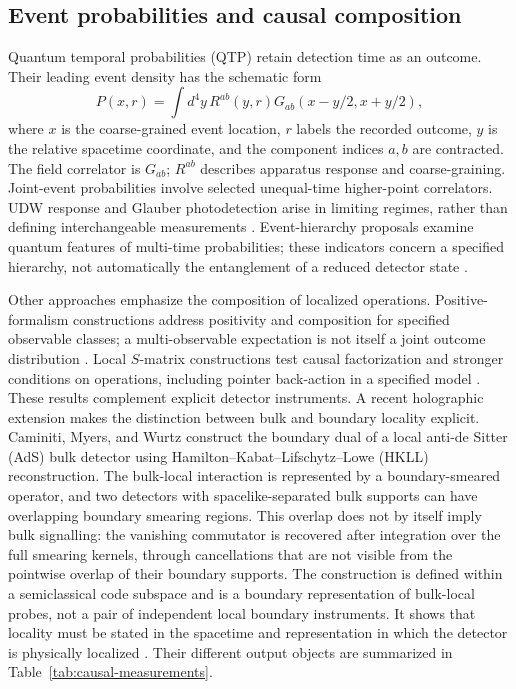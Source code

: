 \documentclass[pdflatex,sn-mathphys-num]{sn-jnl}
\begin{document}
\subsection{Event probabilities and causal composition}
Quantum temporal probabilities (QTP) retain detection time as an outcome. Their leading event density has the schematic form
\begin{equation}
P(x,r)=\int d^4y\,R^{ab}(y,r)
G_{ab}(x-y/2,x+y/2),
\label{eq:qtp}
\end{equation}
where $x$ is the coarse-grained event location, $r$ labels the recorded outcome, $y$ is the relative spacetime coordinate, and the component indices $a,b$ are contracted. The field correlator is $G_{ab}$; $R^{ab}$ describes apparatus response and coarse-graining. Joint-event probabilities involve selected unequal-time higher-point correlators. UDW response and Glauber photodetection arise in limiting regimes, rather than defining interchangeable measurements \cite{AnastopoulosSavvidou2012,AnastopoulosSavvidou2019,AnastopoulosHuSavvidou2023,Koliopoulou2026}. Event-hierarchy proposals examine quantum features of multi-time probabilities; these indicators concern a specified hierarchy, not automatically the entanglement of a reduced detector state \cite{AnastopoulosSavvidou2025}.

Other approaches emphasize the composition of localized operations. Positive-formalism constructions address positivity and composition for specified observable classes; a multi-observable expectation is not itself a joint outcome distribution \cite{Oeckl2026,OecklZampeli2026}. Local $S$-matrix constructions test causal factorization and stronger conditions on operations, including pointer back-action in a specified model \cite{Simmons2026}. These results complement explicit detector instruments. A recent holographic extension makes the distinction between bulk and boundary locality explicit. Caminiti, Myers, and Wurtz construct the boundary dual of a local anti-de Sitter (AdS) bulk detector using Hamilton--Kabat--Lifschytz--Lowe (HKLL) reconstruction. The bulk-local interaction is represented by a boundary-smeared operator, and two detectors with spacelike-separated bulk supports can have overlapping boundary smearing regions. This overlap does not by itself imply bulk signalling: the vanishing commutator is recovered after integration over the full smearing kernels, through cancellations that are not visible from the pointwise overlap of their boundary supports. The construction is defined within a semiclassical code subspace and is a boundary representation of bulk-local probes, not a pair of independent local boundary instruments. It shows that locality must be stated in the spacetime and representation in which the detector is physically localized \cite{CaminitiMyersWurtz2026}. Their different output objects are summarized in Table~\ref{tab:causal-measurements}.
\end{document}

